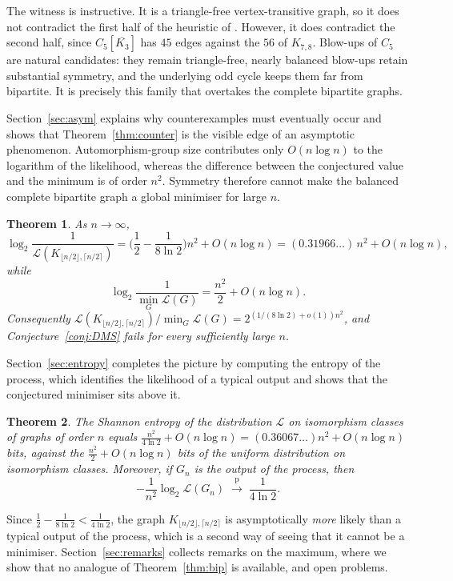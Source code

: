 \documentclass[11pt]{article}
\newtheorem{theorem}{Theorem}
\theoremstyle{definition}
\newcommand{\Lk}{\mathcal{L}}
\newcommand{\Kbal}{K_{\lfloor n/2\rfloor,\lceil n/2\rceil}}
\begin{document}
The witness is instructive. It is a triangle-free vertex-transitive graph, so it does not contradict the first half of the heuristic of \cite{DMS18}. However, it does contradict the second half, since $C_5[\overline{K_3}]$ has $45$ edges against the $56$ of $K_{7,8}$. Blow-ups of $C_5$ are natural candidates: they remain triangle-free, nearly balanced blow-ups retain substantial symmetry, and the underlying odd cycle keeps them far from bipartite. It is precisely this family that overtakes the complete bipartite graphs.

Section~\ref{sec:asym} explains why counterexamples must eventually occur and shows that Theorem~\ref{thm:counter} is the visible edge of an asymptotic phenomenon. Automorphism-group size contributes only $O(n\log n)$ to the logarithm of the likelihood, whereas the difference between the conjectured value and the minimum is of order $n^2$. Symmetry therefore cannot make the balanced complete bipartite graph a global minimiser for large $n$.

\begin{theorem}\label{thm:asym}
As $n\to\infty$,
\[
\log_2\frac{1}{\Lk(\Kbal)}=\Big(\frac12-\frac1{8\ln 2}\Big)n^2+O(n\log n)
=(0.31966\ldots)\,n^2+O(n\log n),
\]
while
\[
\log_2\frac{1}{\min_G\Lk(G)}=\frac{n^2}{2}+O(n\log n).
\]
Consequently $\Lk(\Kbal)\big/\min_G\Lk(G)=2^{(1/(8\ln 2)+o(1))n^2}$, and Conjecture~\ref{conj:DMS} fails for every sufficiently large $n$.
\end{theorem}

Section~\ref{sec:entropy} completes the picture by computing the entropy of the process, which identifies the likelihood of a typical output and shows that the conjectured minimiser sits above it.

\begin{theorem}\label{thm:entropy}
The Shannon entropy of the distribution $\Lk$ on isomorphism classes of graphs of order $n$ equals $\frac{n^2}{4\ln 2}+O(n\log n)=(0.36067\ldots)n^2+O(n\log n)$ bits, against the $\frac{n^2}{2}+O(n\log n)$ bits of the uniform distribution on isomorphism classes.
Moreover, if $G_n$ is the output of the process, then
\[
-\frac{1}{n^2}\log_2\Lk(G_n)\;\xrightarrow{\mathrm p}\;\frac{1}{4\ln 2}.
\]
\end{theorem}

Since $\tfrac12-\tfrac{1}{8\ln 2}<\tfrac{1}{4\ln 2}$, the graph $\Kbal$ is asymptotically \emph{more} likely than a typical output of the process, which is a second way of seeing that it cannot be a minimiser. Section~\ref{sec:remarks} collects remarks on the maximum, where we show that no analogue of Theorem~\ref{thm:bip} is available, and open problems.
\end{document}
